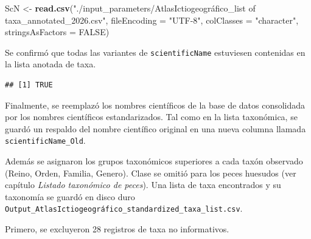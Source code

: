 \documentclass[sn-apa,pdflatex]{sn-jnl}
\newenvironment{Shaded}{\begin{snugshade}}{\end{snugshade}}
\newcommand{\AttributeTok}[1]{\textcolor[rgb]{0.13,0.29,0.53}{#1}}
\newcommand{\CommentTok}[1]{\textcolor[rgb]{0.56,0.35,0.01}{\textit{#1}}}
\newcommand{\ConstantTok}[1]{\textcolor[rgb]{0.56,0.35,0.01}{#1}}
\newcommand{\FunctionTok}[1]{\textcolor[rgb]{0.13,0.29,0.53}{\textbf{#1}}}
\newcommand{\NormalTok}[1]{#1}
\newcommand{\OtherTok}[1]{\textcolor[rgb]{0.56,0.35,0.01}{#1}}
\newcommand{\SpecialCharTok}[1]{\textcolor[rgb]{0.81,0.36,0.00}{\textbf{#1}}}
\newcommand{\StringTok}[1]{\textcolor[rgb]{0.31,0.60,0.02}{#1}}
\begin{document}
\begin{Shaded}
\begin{Highlighting}[]
\NormalTok{ScN }\OtherTok{\textless{}{-}} \FunctionTok{read.csv}\NormalTok{(}\StringTok{"./input\_parameters/AtlasIctiogeográfico\_list of taxa\_annotated\_2026.csv"}\NormalTok{,}
    \AttributeTok{fileEncoding =} \StringTok{"UTF{-}8"}\NormalTok{, }\AttributeTok{colClasses =} \StringTok{"character"}\NormalTok{, }\AttributeTok{stringsAsFactors =} \ConstantTok{FALSE}\NormalTok{)}
\end{Highlighting}
\end{Shaded}

Se confirmó que todas las variantes de \texttt{scientificName}
estuviesen contenidas en la lista anotada de taxa.

\begin{Shaded}
\end{Shaded}

\begin{verbatim}
## [1] TRUE
\end{verbatim}

Finalmente, se reemplazó los nombres científicos de la base de datos
consolidada por los nombres científicos estandarizados. Tal como en la
lista taxonómica, se guardó un respaldo del nombre científico original
en una nueva columna llamada \texttt{scientificName\_Old}.

Además se asignaron los grupos taxonómicos superiores a cada taxón
observado (Reino, Orden, Familia, Genero). Clase se omitió para los
peces huesudos (ver capítulo \emph{Listado taxonómico de peces}). Una
lista de taxa encontrados y su taxonomía se guardó en disco duro
\texttt{Output\_AtlasIctiogeográfico\_standardized\_taxa\_list.csv}.

Primero, se excluyeron 28 registros de taxa no informativos.

\begin{Shaded}
\end{Shaded}
\end{document}
